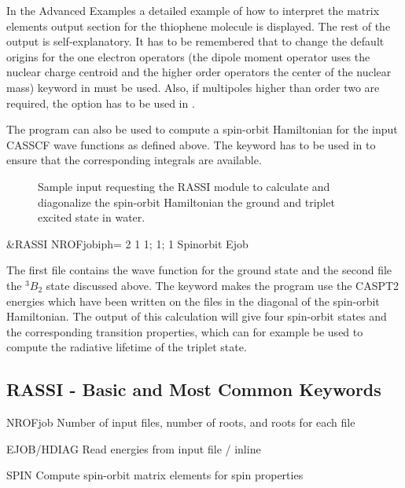 In the Advanced Examples a detailed example of how to interpret
the matrix elements output section for the thiophene molecule is
displayed. The rest of the output is self-explanatory. It has to be
remembered that to change the default origins for the one electron
operators (the dipole moment operator uses the nuclear charge
centroid and the higher order operators the center of the nuclear
mass) keyword  in  must be used.
Also, if multipoles higher than order two are required, the
option  has to be used in .

The program  can also be used to compute a spin-orbit Hamiltonian
for the input CASSCF wave functions as defined above. The keyword 
has to be used in  to ensure that the corresponding integrals
are available.

\begin{figure}[ht]
\caption{Sample input requesting the RASSI module to calculate and diagonalize 
the spin-orbit Hamiltonian the ground and triplet excited state in water.}
\label{fig:rassi_input1}
\end{figure}
\begin{inputlisting}
 &RASSI
NROFjobiph= 2 1 1; 1; 1
Spinorbit 
Ejob
\end{inputlisting}

The first  file contains the wave function for the ground state and
the second file the $^3B_2$ state discussed above. The keyword 
makes the  program use the CASPT2 energies which have been 
written on the  files in the diagonal of the spin-orbit
Hamiltonian. The output of this calculation will give four spin-orbit states and
the corresponding transition properties, which can for example be used to
compute the radiative lifetime of the triplet state.

\subsection{RASSI - Basic and Most Common Keywords}
\begin{keywordlist}
\item[NROFjob] Number of input files, number of roots, and roots for each file
\item[EJOB/HDIAG] Read energies from input file / inline
\item[SPIN] Compute spin-orbit matrix elements for spin properties
\item[]

\end{keywordlist}

